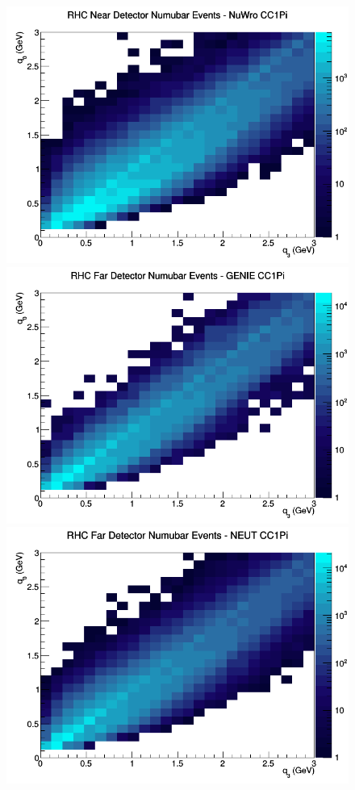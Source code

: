 \begin{figure}[h]
\includegraphics[width=\linewidth]{eff_q0_q3/GAr/CC1Pi_RHC_ND_numubar_q3_q0_NuWro.png}
\endminipage
\newline
{}
\includegraphics[width=\linewidth]{eff_q0_q3/GAr/CC1Pi_RHC_FD_numubar_q3_q0_GENIE.png}
\endminipage
{}
\includegraphics[width=\linewidth]{eff_q0_q3/GAr/CC1Pi_RHC_FD_numubar_q3_q0_NEUT.png}

\end{figure}
